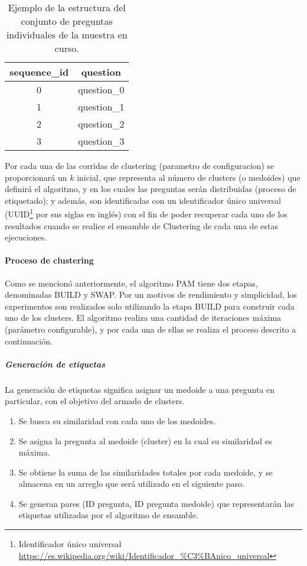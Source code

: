 \begin{table}[]
	\centering
	\begin{tabular}{|c|c|}
		\hline
		\textbf{sequence\_id} & \textbf{question} \\ \hline
		0                     & question\_0       \\ \hline
		1                     & question\_1       \\ \hline
		2                     & question\_2       \\ \hline
		3                     & question\_3       \\ \hline
	\end{tabular}
	\caption{Ejemplo de la estructura del conjunto de preguntas individuales de la muestra en curso.}
	\label{tab:preguntas-individuales}
\end{table}

\bigskip Por cada una de las corridas de clustering (parametro de configuracion) se proporcionará un \(k\) inicial, que representa al número de clusters (o medoides) que definirá el algoritmo, y en los cuales las preguntas serán distribuidas (proceso de etiquetado); y además, son identificadas con un identificador único universal (UUID\footnote{Identificador único universal \url{https://es.wikipedia.org/wiki/Identificador\_\%C3\%BAnico_universal}} por sus siglas en inglés) con el fin de poder recuperar cada uno de los resultados cuando se realice el ensamble de Clustering de cada una de estas ejecuciones.

\paragraph{Proceso de clustering}
Como se mencionó anteriormente, el algoritmo PAM tiene dos etapas, denominadas BUILD y SWAP. Por un motivos de rendimiento y simplicidad, los experimentos son realizados solo utilizando la etapa BUILD para construir cada uno de los clusters. El algoritmo realiza una cantidad de iteraciones máxima (parámetro configurable), y por cada una de ellas se realiza el proceso descrito a continuación.

\subparagraph{Generación de etiquetas}
La generación de etiquetas significa asignar un medoide a una pregunta en particular, con el objetivo del armado de clusters.
\begin{enumerate}
	\item Se busca su similaridad con cada uno de los medoides.
	\item Se asigna la pregunta al medoide (cluster) en la cual su similaridad es máxima.
	\item Se obtiene la suma de las similaridades totales por cada medoide, y se almacena en un arreglo que será utilizado en el siguiente paso.
	\item Se generan pares (ID pregunta, ID pregunta medoide) que representarán las etiquetas utilizadas por el algoritmo de ensamble.
\end{enumerate}

